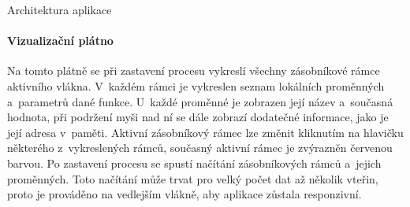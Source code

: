 \documentclass[czech,bachelor,male,python,dept460,hidelinks]{diploma}						%
\begin{document}
\begin{section}{Architektura aplikace}
	\paragraph*{Vizualizační plátno} Na tomto plátně se při zastavení procesu vykreslí všechny zásobníkové rámce aktivního vlákna. V~každém rámci je
		vykreslen seznam lokálních proměnných a~parametrů dané funkce. U~každé proměnné je zobrazen její název a~současná hodnota, při podržení myši nad ní se dále
		zobrazí dodatečné informace, jako je její adresa v~paměti. Aktivní zásobníkový rámec lze změnit kliknutím na hlavičku některého z~vykreslených
		rámců, současný aktivní rámec je zvýrazněn červenou barvou. Po zastavení procesu se spustí načítání zásobníkových
		rámců a~jejich proměnných. Toto načítání může trvat pro velký počet dat až několik vteřin, proto je prováděno na vedlejším vlákně, aby aplikace
		zůstala responzivní.
		
\end{section}
\end{document}

